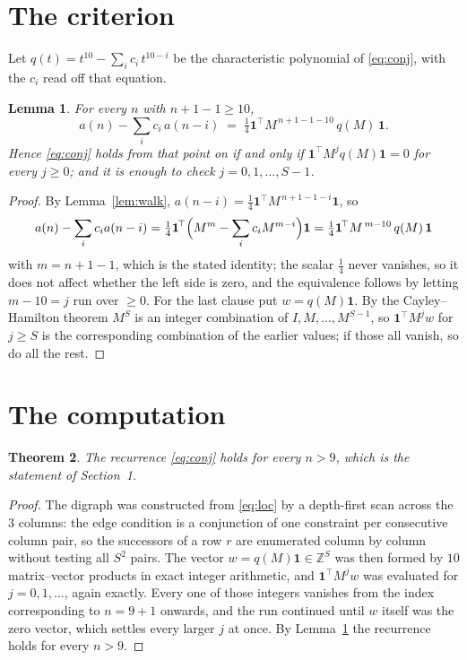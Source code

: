 \documentclass[11pt,a4paper]{article}
\theoremstyle{plain}
\newtheorem{theorem}{Theorem}
\newtheorem{lemma}[theorem]{Lemma}
\theoremstyle{definition}
\begin{document}
\section{The criterion}

Let $q(t)=t^{10}-\sum_i c_i\,t^{10-i}$ be the characteristic polynomial of
\eqref{eq:conj}, with the $c_i$ read off that equation.

\begin{lemma}\label{lem:crit}
For every $n$ with $n+1-1\ge10$,
\[
a(n)-\sum_i c_i\,a(n-i)\;=\;\tfrac1{4}\mathbf{1}^{\!\top}M^{\,n+1-1-10}\,q(M)\,\mathbf{1} .
\]
Hence \eqref{eq:conj} holds from that point on if and only if
$\mathbf{1}^{\!\top}M^{j}q(M)\mathbf{1}=0$ for every $j\ge0$; and it is enough to check
$j=0,1,\dots,S-1$.
\end{lemma}

\begin{proof}
By Lemma~\ref{lem:walk}, $a(n-i)=\tfrac1{4}\mathbf{1}^{\!\top}M^{\,n+1-1-i}\mathbf{1}$, so
\[
a(n)-\sum_i c_i a(n-i)
=\tfrac1{4}\mathbf{1}^{\!\top}\Bigl(M^{m}-\sum_i c_i M^{m-i}\Bigr)\mathbf{1}
=\tfrac1{4}\mathbf{1}^{\!\top}M^{\,m-10}\,q(M)\,\mathbf{1}
\]
with $m=n+1-1$, which is the stated identity; the scalar $\tfrac1{4}$ never vanishes, so it does not affect whether the left side is zero, and the equivalence follows by letting
$m-10=j$ run over $\ge0$. For the last clause put $w=q(M)\mathbf{1}$. By the
Cayley--Hamilton theorem $M^{S}$ is an integer combination of $I,M,\dots,M^{S-1}$, so
$\mathbf{1}^{\!\top}M^{j}w$ for $j\ge S$ is the corresponding combination of the earlier
values; if those all vanish, so do all the rest.
\end{proof}

\section{The computation}

\begin{theorem}
The recurrence \eqref{eq:conj} holds for every $n>9$, which is the statement of
Section~1.
\end{theorem}

\begin{proof}
The digraph was constructed from \eqref{eq:loc} by a depth-first scan across the $3$
columns: the edge condition is a conjunction of one constraint per consecutive column
pair, so the successors of a row $r$ are enumerated column by column without testing all
$S^2$ pairs. The vector $w=q(M)\mathbf{1}\in\mathbb{Z}^{S}$ was then formed by $10$
matrix--vector products in exact integer arithmetic, and $\mathbf{1}^{\!\top}M^{j}w$ was
evaluated for $j=0,1,\dots$, again exactly. Every one of those integers vanishes from the
index corresponding to $n=9+1$ onwards, and the run continued until $w$ itself was the
zero vector, which settles every larger $j$ at once. By Lemma~\ref{lem:crit} the recurrence
holds for every $n>9$.
\end{proof}
\end{document}
